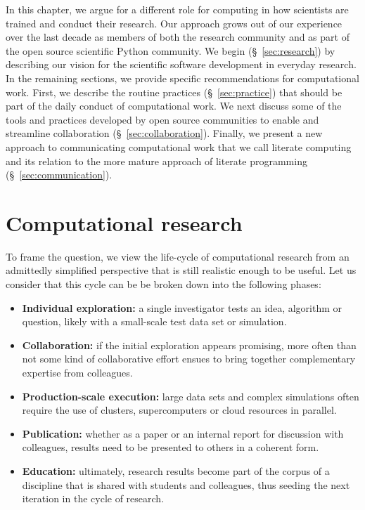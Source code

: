 \documentclass[ChapterTOCs,krantz2]{krantz} %
\theoremstyle{definition}
\begin{document}
In this chapter, we argue for a different role for computing in how
scientists are trained and conduct their research. Our approach grows out
of our experience over the last decade as members of both the research
community and as part of the open source scientific Python community.  We begin
(§~\ref{sec:research}) by describing our vision for the scientific
software development in everyday research. In the remaining sections,
we provide specific recommendations for computational work. First,
we describe the routine practices (§~\ref{sec:practice}) that should be
part of the daily conduct of computational work. We next discuss some of
the tools and practices developed by open source communities to enable
and streamline collaboration (§~\ref{sec:collaboration}). Finally,
we present a new approach to communicating computational work that we call
literate computing and its relation to the more mature approach of literate
programming (§~\ref{sec:communication}).


\section{\label{sec:research}Computational research}

To frame the question, we view the life-cycle of computational research from an
admittedly simplified perspective that is still realistic enough to be
useful. Let us consider that this cycle can be be broken down into the
following phases:

\begin{itemize}
\item \textbf{Individual exploration:} a single investigator tests an idea,
  algorithm or question, likely with a small-scale test data set or simulation.
\item \textbf{Collaboration:} if the initial exploration appears promising,
  more often than not some kind of collaborative effort ensues to bring
  together complementary expertise from colleagues.
\item \textbf{Production-scale execution:} large data sets and complex
  simulations often require the use of clusters, supercomputers or cloud
  resources in parallel.
\item \textbf{Publication:} whether as a paper or an internal report for
  discussion with colleagues, results need to be presented to others in a
  coherent form.
\item \textbf{Education:} ultimately, research results become part of the
  corpus of a discipline that is shared with students and colleagues, thus
  seeding the next iteration in the cycle of research.
\end{itemize}
\end{document}
